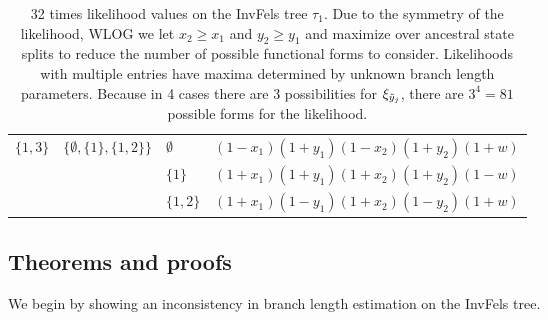 \begin{table}
\begin{tabular}{|lll|l|}
$\{1,3\}$  &$\{\emptyset,\{1\},\{1,2\}\}$&$\emptyset$&$(1-x_1)(1+y_1)(1-x_2)(1+y_2)(1+w)$\\
&&$\{1\}$&$(1+x_1)(1+y_1)(1+x_2)(1+y_2)(1-w)$\\
&&$\{1,2\}$&$(1+x_1)(1-y_1)(1+x_2)(1-y_2)(1+w)$\\
\hline
\end{tabular}
\caption{
32 times likelihood values on the InvFels tree $\tau_1$.
Due to the symmetry of the likelihood, WLOG we let $x_2 \ge x_1$ and $y_2 \ge y_1$ and maximize over ancestral state splits to reduce the number of possible functional forms to consider.
Likelihoods with multiple entries have maxima determined by unknown branch length parameters.
Because in 4 cases there are 3 possibilities for $\xi_{\tilde{y}_j}$, there are $3^4=81$ possible forms for the likelihood.
}
\label{tab:likelihoods}
\end{table}

\subsection*{Theorems and proofs}


We begin by showing an inconsistency in branch length estimation on the InvFels tree.

\blInconsist*

